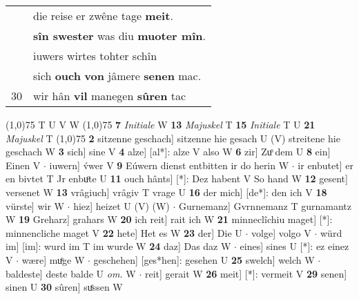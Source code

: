 \documentclass[8pt,a4paper,notitlepage]{article}
\begin{document}
\begin{table}[ht]
\begin{minipage}[t]{0.5\linewidth}
\begin{tabular}{rl}
 & die reise er zwêne tage \textbf{meit}.\\ 
 & \textbf{sîn swester} was diu \textbf{muoter mîn}.\\ 
 & iuwers wirtes tohter schîn\\ 
 & sich \textbf{ouch} \textbf{von} jâmere \textbf{senen} mac.\\ 
30 & wir hân \textbf{vil} manegen \textbf{sûren} tac\\ 
\end{tabular}
\scriptsize
\line(1,0){75} \newline
T U V W \newline
\line(1,0){75} \newline
\textbf{7} \textit{Initiale} W  \textbf{13} \textit{Majuskel} T  \textbf{15} \textit{Initiale} T U  \textbf{21} \textit{Majuskel} T  \newline
\line(1,0){75} \newline
\textbf{2} sitzenne geschach] sitzenne hie gesach U (V) streitene hie geschach W \textbf{3} sich] sine V \textbf{4} alze] [al*]: alze V also W \textbf{6} zir] Zuͦ dem U \textbf{8} ein] Einen V  $\cdot$ iuwern] v́wer V \textbf{9} Eúwern dienst entbitten ir do herin W  $\cdot$ ir enbutet] er en bivtet T Jr enbuͦte U \textbf{11} ouch hânts] [*]: Dez habent V So hand W \textbf{12} gesent] versenet W \textbf{13} vrâgiuch] vrâgiv T vrage U \textbf{16} der mich] [de*]: den ich V \textbf{18} vürste] wir W  $\cdot$ hiez] heizet U (V) (W)  $\cdot$ Gurnemanz] Gvrnnemanz T gurnamantz W \textbf{19} Greharz] grahars W \textbf{20} ich reit] rait ich W \textbf{21} minneclîchiu maget] [*]: minnencliche maget V \textbf{22} hete] Het es W \textbf{23} der] Die U  $\cdot$ volge] volgo V  $\cdot$ würd im] [im]: wurd im T im wurde W \textbf{24} daz] Das daz W  $\cdot$ eines] sines U [*]: ez einez V  $\cdot$ wære] muͤge W  $\cdot$ geschehen] [ges*hen]: gesehen U \textbf{25} swelch] welch W  $\cdot$ baldeste] deste balde U \textit{om.} W  $\cdot$ reit] gerait W \textbf{26} meit] [*]: vermeit V \textbf{29} senen] sinen U \textbf{30} sûren] suͤssen W \newline
\end{minipage}
\end{table}
\end{document}
